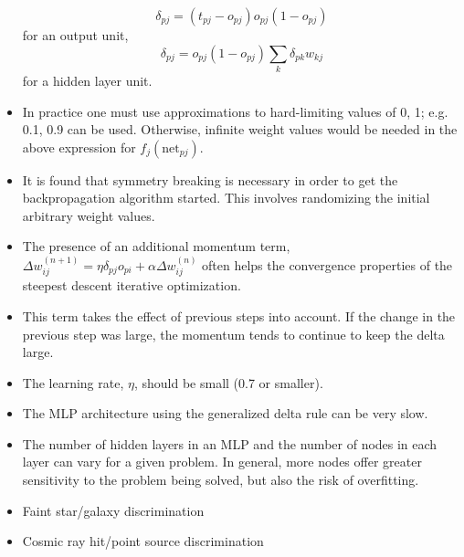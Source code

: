 \documentclass[a4,dvips]{seminar}
\newcommand{\heading}[1]{%
  \begin{center}
    \large\bf
    \shadowbox{#1}%
  \end{center}
  \vspace{1ex minus 1ex}}
\begin{document}
\begin{slide}
\begin{itemize}
$$\delta_{pj} = (t_{pj} -o_{pj}) o_{pj} (1 - o_{pj}) $$
for an output unit, 
$$ \delta_{pj} = o_{pj}  (1 - o_{pj}) \sum_k \delta_{pk} 
w_{kj}$$
for a hidden layer unit.


\item In practice one must use approximations to hard-limiting values of 0, 1; 
e.g. 0.1, 0.9 can be used.  Otherwise, infinite weight values would be 
needed in the above expression for $f_j(\mbox{net}_{pj})$.  

\item It is found that symmetry breaking is necessary in order to get the 
backpropagation algorithm started.  This involves randomizing the initial
arbitrary weight values. 

\item The presence of an additional momentum term, $\Delta w_{ij}^{(n+1)} = 
\eta \delta_{pj} o_{pi} + \alpha \Delta w_{ij}^{(n)} $ often helps the 
convergence properties of the steepest descent iterative optimization.  
\item This term takes the effect of previous steps into account.  If the change
in the previous step was large, the momentum tends to continue to keep
the delta large.  

\item The learning rate, $\eta$, should be small (0.7 or smaller). 

\item The MLP architecture using the generalized delta rule can be very slow.
\item The number of hidden layers in an MLP and the number of nodes in each 
layer can vary for a given problem.  In general, more nodes offer greater
sensitivity to the problem being solved, but also the risk of overfitting.
\end{itemize}
\end{slide}

\begin{slide}
\textcolor {reddish} {\heading{Examples}}
\begin{itemize}
\item Faint star/galaxy discrimination
\item Cosmic ray hit/point source discrimination
\end{itemize}
\end{slide}
\end{document}

